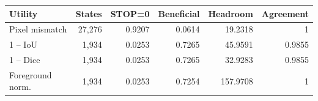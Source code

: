 \begin{center}
\begin{minipage}{\linewidth}
\centering
\small
\setlength{\tabcolsep}{4pt}
\label{tab:utility-sensitivity}
\begin{tabular}{lrrrrr}
\toprule
Utility & States & STOP=0 & Beneficial & Headroom & Agreement \\
\midrule
Pixel mismatch & 27,276 & 0.9207 & 0.0614 & 19.2318 & 1 \\
1 -- IoU & 1,934 & 0.0253 & 0.7265 & 45.9591 & 0.9855 \\
1 -- Dice & 1,934 & 0.0253 & 0.7265 & 32.9283 & 0.9855 \\
Foreground norm. & 1,934 & 0.0253 & 0.7254 & 157.9708 & 1 \\
\bottomrule
\end{tabular}
\end{minipage}
\end{center}
